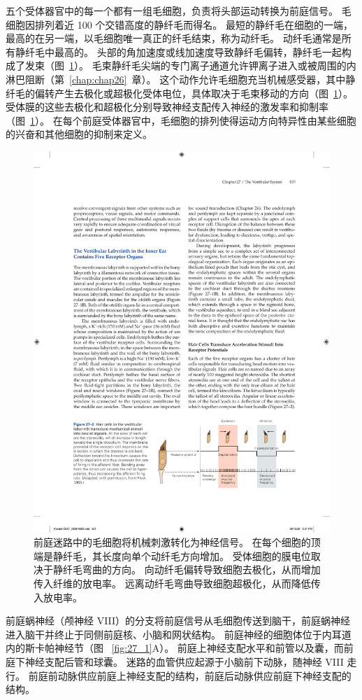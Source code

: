 五个受体器官中的每一个都有一组毛细胞，负责将头部运动转换为前庭信号。
毛细胞因排列着近 100 个交错高度的静纤毛而得名。
最短的静纤毛在细胞的一端，最高的在另一端，以毛细胞唯一真正的纤毛结束，称为动纤毛。
动纤毛通常是所有静纤毛中最高的。
头部的角加速度或线加速度导致静纤毛偏转，静纤毛一起构成了发束（图~\ref{fig:27_2}）。
毛束静纤毛尖端的专门离子通道允许钾离子进入或被周围的内淋巴阻断（第~\ref{chap:chap26}~章）。
这个动作允许毛细胞充当机械感受器，其中静纤毛的偏转产生去极化或超极化受体电位，具体取决于毛束移动的方向（图~\ref{fig:27_2}）。
受体膜的这些去极化和超极化分别导致神经支配传入神经的激发率和抑制率（图~\ref{fig:27_2}）。
在每个前庭受体器官中，毛细胞的排列使得运动方向特异性由某些细胞的兴奋和其他细胞的抑制来定义。


\begin{figure}[htbp]
	\centering
	\includegraphics[width=0.7\linewidth]{chap27/fig_27_2}
	\caption{前庭迷路中的毛细胞将机械刺激转化为神经信号。
		在每个细胞的顶端是静纤毛，其长度向单个动纤毛方向增加。
		受体细胞的膜电位取决于静纤毛弯曲的方向。
		向动纤毛偏转导致细胞去极化，从而增加传入纤维的放电率。
		远离动纤毛弯曲导致细胞超极化，从而降低传入放电率\cite{flock1965transducing}。}
	\label{fig:27_2}
\end{figure}


前庭蜗神经（颅神经 VIII）的分支将前庭信号从毛细胞传送到脑干，前庭蜗神经进入脑干并终止于同侧前庭核、小脑和网状结构。
前庭神经的细胞体位于内耳道内的斯卡帕神经节（图 ~\ref{fig:27_1}A）。
前庭上神经支配水平和前管以及囊，而前庭下神经支配后管和球囊。
迷路的血管供应起源于小脑前下动脉，随神经 VIII 走行。
前庭前动脉供应前庭上神经支配的结构，前庭后动脉供应前庭下神经支配的结构。


